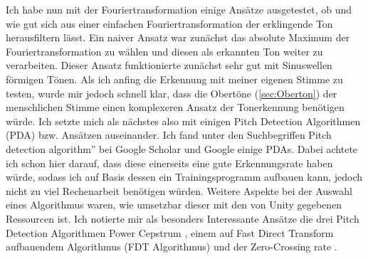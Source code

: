 Ich habe nun mit der Fouriertransformation einige Ansätze ausgetestet, ob und wie gut sich aus einer einfachen Fouriertransformation der erklingende Ton herausfiltern lässt. Ein naiver Ansatz war zunächst das absolute Maximum der Fouriertransformation zu wählen und diesen als erkannten Ton weiter zu verarbeiten. Dieser Ansatz funktionierte zunächst sehr gut mit Sinuswellen förmigen Tönen. Als ich anfing die Erkennung mit meiner eigenen Stimme zu testen, wurde mir jedoch schnell klar, dass die Obertöne (\ref{sec:Oberton}) der menschlichen Stimme einen komplexeren Ansatz der Tonerkennung benötigen würde. Ich setzte mich als nächstes also mit einigen Pitch Detection Algorithmen (PDA) bzw. Ansätzen auseinander. Ich fand unter den Suchbegriffen \glqq Pitch detection algorithm'' bei Google Scholar und Google einige PDAs. Dabei achtete ich schon hier darauf, dass diese einerseits eine gute Erkennungsrate haben würde, sodass ich auf Basis dessen ein Trainingsprogramm aufbauen kann, jedoch nicht zu viel Rechenarbeit benötigen würden. Weitere Aspekte bei der Auswahl eines Algorithmus waren, wie umsetzbar dieser mit den von Unity gegebenen Ressourcen ist. Ich notierte mir als besonders Interessante Ansätze die drei Pitch Detection Algorithmen Power Cepstrum \cite{norton2003fundamentals}, einem auf Fast Direct Transform aufbauendem Algorithmus (FDT Algorithmus) \cite{yazama2005simple} und der Zero-Crossing rate \cite{amado2008pitch}. 


